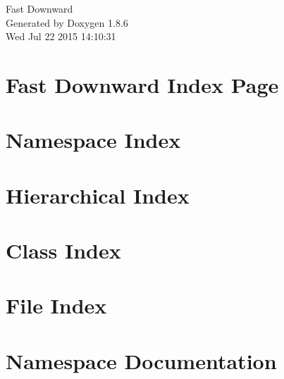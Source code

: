 \documentclass[twoside]{book}
\newcommand{\clearemptydoublepage}{%
  \newpage{\pagestyle{empty}\cleardoublepage}%
}
\begin{document}
\hypersetup{pageanchor=false}
\begin{titlepage}
\vspace*{7cm}
\begin{center}%
{\Large Fast Downward }\\
\vspace*{1cm}
{\large Generated by Doxygen 1.8.6}\\
\vspace*{0.5cm}
{\small Wed Jul 22 2015 14:10:31}\\
\end{center}
\end{titlepage}
\clearemptydoublepage
\tableofcontents
\clearemptydoublepage
{}
\hypersetup{pageanchor=true}

\chapter{Fast Downward Index Page}
\label{index}\hypertarget{index}{}
\chapter{Namespace Index}

\chapter{Hierarchical Index}

\chapter{Class Index}

\chapter{File Index}

\chapter{Namespace Documentation}


\end{document}
